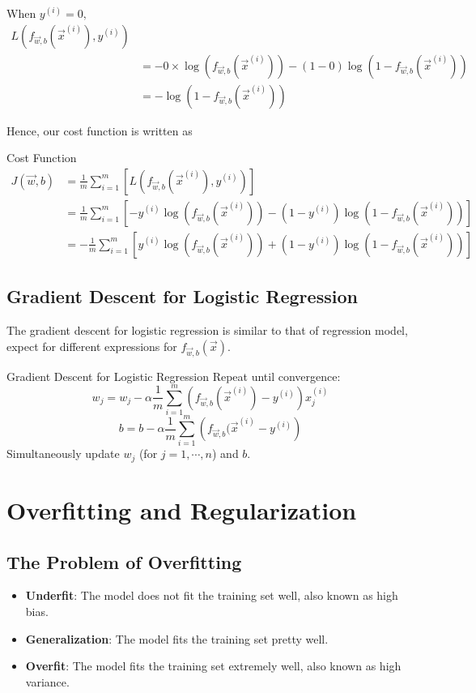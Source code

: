 \documentclass[12pt,a4paper]{article}
\begin{document}
When $y^{(i)}=0,$ 
$$\begin{aligned}
	L\left(f_{\vec{w},b}(\vec{x}^{(i)}),y^{(i)}\right)&\\
	&=-0\times\log\left(f_{\vec{w},b}(\vec{x}^{(i)})\right)-(1-0)\log\left(1-f_{\vec{w},b}(\vec{x}^{(i)})\right)\\
	&=-\log\left(1-f_{\vec{w},b}(\vec{x}^{(i)})\right)
	\end{aligned}$$

Hence, our cost function is written as
\begin{thmbox}{Cost Function}
	$$\begin{aligned}
		J(\vec{w},b)&=\frac{1}{m}\sum_{i=1}^m\left[L\left(f_{\vec{w},b}(\vec{x}^{(i)}),y^{(i)}\right)\right]\\
		&=\frac{1}{m}\sum_{i=1}^m\left[-y^{(i)}\log\left(f_{\vec{w},b}(\vec{x}^{(i)})\right)-(1-y^{(i)})\log\left(1-f_{\vec{w},b}(\vec{x}^{(i)})\right)\right]\\
		&=-\frac{1}{m}\sum_{i=1}^m\left[y^{(i)}\log\left(f_{\vec{w},b}(\vec{x}^{(i)})\right)+(1-y^{(i)})\log\left(1-f_{\vec{w},b}(\vec{x}^{(i)})\right)\right]
		\end{aligned}$$
\end{thmbox}

\subsection{Gradient Descent for Logistic Regression}
\quad The gradient descent for logistic regression is similar to that of regression model, expect for different expressions for $f_{\vec{w},b}(\vec{x})$.
\begin{rmkbox}{Gradient Descent for Logistic Regression}
	Repeat until convergence: 
	$$w_j=w_j-\alpha\frac{1}{m}\sum_{i=1}^{m}\left(f_{\vec{w},b}(\vec{x}^{(i)})-y^{(i)}\right)x_j^{(i)}$$
	$$b=b-\alpha\frac{1}{m}\sum_{i=1}^{m}\left(f_{\vec{w},b}(\vec{x}^{(i)}-y^{(i)}\right)$$
	Simultaneously update $w_j$ (for $j=1,\cdots,n$) and $b$.
\end{rmkbox}

\section{Overfitting and Regularization}
\subsection{The Problem of Overfitting}
\begin{itemize}
	\item \textbf{Underfit}: The model does not fit the training set well, also known as high bias. 
	\item \textbf{Generalization}: The model fits the training set pretty well. 
	\item \textbf{Overfit}: The model fits the training set extremely well, also known as high variance. 
\end{itemize}
\end{document}
